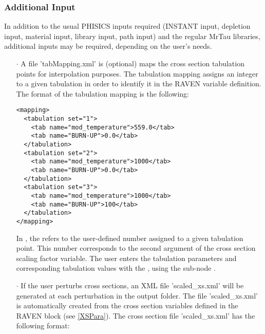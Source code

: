 \subsubsection{Additional Input}
\label{subsubsection:PhisicsAdditionalInput}
In addition to the usual PHISICS inputs required (INSTANT input, depletion input, material
 input, library input, path input) and the regular MrTau libraries, additional inputs may be required, depending on the user's needs.
\begin{enumerate}
\item [$\cdot$]A file 'tabMapping.xml' is (optional) maps the cross section tabulation points for interpolation purposes.
The tabulation mapping assigns an integer to a given tabulation in order to identify it in the RAVEN variable definition.
The format of the tabulation mapping is the following:
\begin{lstlisting}[style=XML]
<mapping>
  <tabulation set="1">
    <tab name="mod_temperature">559.0</tab>
    <tab name="BURN-UP">0.0</tab>
  </tabulation>
  <tabulation set="2">
    <tab name="mod_temperature">1000</tab>
    <tab name="BURN-UP">0.0</tab>
  </tabulation>
  <tabulation set="3">
    <tab name="mod_temperature">1000</tab>
    <tab name="BURN-UP">100</tab>
  </tabulation>
</mapping>
\end{lstlisting}
In , the  refers to the user-defined number assigned to a given tabulation point.
This  number corresponds to the second argument of the cross section scaling factor variable.
The user enters the tabulation parameters and corresponding tabulation values with the ,
 using the sub-node .

\item [$\cdot$]If the user perturbs cross sections, an XML file 'scaled\_xs.xml' will be generated at each perturbation
 in the output folder.
The file 'scaled\_xs.xml' is automatically created from the cross section variables defined in the RAVEN
 block (see \ref{XSPara}). The cross section file 'scaled\_xs.xml' has the following format:


\end{enumerate}
